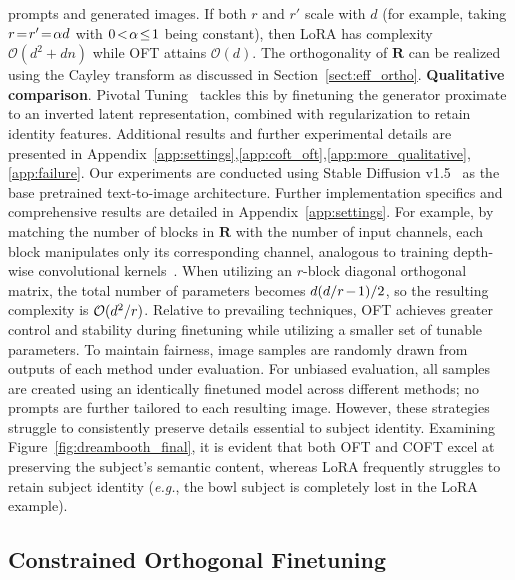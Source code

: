 \begin{itemize}[leftmargin=*,nosep]
\begin{itemize}[leftmargin=*,nosep]
prompts and generated images. If both $r$ and $r'$ scale with $d$ (for example, taking $\thickmuskip=2mu \medmuskip=2mu r=r'=\alpha d$ with $\thickmuskip=2mu \medmuskip=2mu 0<\alpha\leq 1$ being constant), then LoRA has complexity $\mathcal{O}(d^2+dn)$ while OFT attains $\mathcal{O}(d)$. The orthogonality of $\bm{R}$ can be realized using the Cayley transform as discussed in Section~\ref{sect:eff_ortho}. \textbf{Qualitative comparison}. Pivotal Tuning~\cite{roich2022pivotal} tackles this by finetuning the generator proximate to an inverted latent representation, combined with regularization to retain identity features. Additional results and further experimental details are presented in Appendix~\ref{app:settings},\ref{app:coft_oft},\ref{app:more_qualitative},\ref{app:failure}. Our experiments are conducted using Stable Diffusion v1.5~\cite{rombach2022high} as the base pretrained text-to-image architecture. Further implementation specifics and comprehensive results are detailed in Appendix~\ref{app:settings}. For example, by matching the number of blocks in $\bm{R}$ with the number of input channels, each block manipulates only its corresponding channel, analogous to training depth-wise convolutional kernels~\cite{chollet2017xception}. When utilizing an $r$-block diagonal orthogonal matrix, the total number of parameters becomes $\thickmuskip=2mu \medmuskip=2mu d(d/r-1)/2$, so the resulting complexity is $\thickmuskip=2mu \medmuskip=2mu \mathcal{O}(d^2/r)$. Relative to prevailing techniques, OFT achieves greater control and stability during finetuning while utilizing a smaller set of tunable parameters. To maintain fairness, image samples are randomly drawn from outputs of each method under evaluation. For unbiased evaluation, all samples are created using an identically finetuned model across different methods; no prompts are further tailored to each resulting image. However, these strategies struggle to consistently preserve details essential to subject identity. Examining Figure~\ref{fig:dreambooth_final}, it is evident that both OFT and COFT excel at preserving the subject's semantic content, whereas LoRA frequently struggles to retain subject identity (\emph{e.g.}, the bowl subject is completely lost in the LoRA example). \subsection{Constrained Orthogonal Finetuning}


\end{itemize}
\end{itemize}
